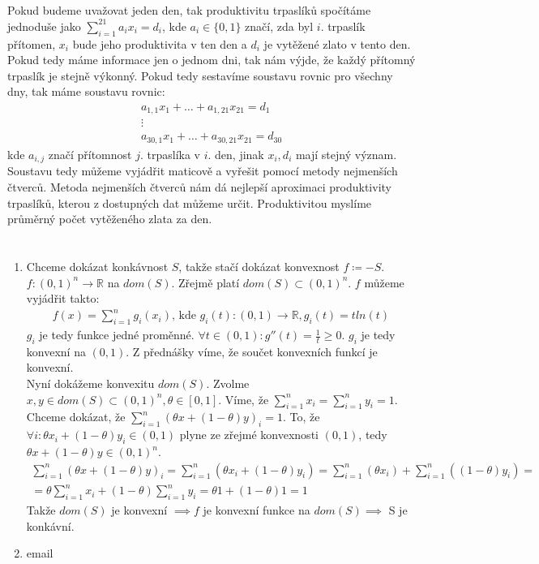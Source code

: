 \documentclass[12pt, a4paper]{article}
\begin{document}
\section{}
Pokud budeme uvažovat jeden den, tak produktivitu trpaslíků spočítáme jednoduše jako $\sum^{21}_{i=1} a_i x_i = d_i$, kde $a_i \in \{0,1\}$ značí, zda byl $i$. trpaslík přítomen, $x_i$ bude jeho produktivita v ten den a $d_i$ je vytěžené zlato v tento den. Pokud tedy máme informace jen o jednom dni, tak nám výjde, že každý přítomný trpaslík je stejně výkonný. Pokud tedy sestavíme soustavu rovnic pro všechny dny, tak máme soustavu rovnic:
\begin{gather*}
a_{1,1}x_1 + \dots + a_{1,21}x_{21} = d_1\\
\vdots\\
a_{30,1}x_1 + \dots + a_{30,21}x_{21} = d_{30}
\end{gather*}
kde $a_{i,j}$ značí přítomnost $j$. trpaslíka v $i$. den, jinak $x_i, d_i$ mají stejný význam. Soustavu tedy můžeme vyjádřit maticově a vyřešit pomocí metody nejmenších čtverců. Metoda nejmenších čtverců nám dá nejlepší aproximaci produktivity trpaslíků, kterou z dostupných dat můžeme určit. Produktivitou myslíme průměrný počet vytěženého zlata za den.

\section{}
\begin{enumerate}[label=\alph*)]
\item Chceme dokázat konkávnost $S$, takže stačí dokázat konvexnost $f \coloneqq -S$. $f: (0,1)^n \rightarrow \mathbb{R}$ na $dom(S)$. Zřejmě platí $dom(S) \subset (0,1)^n$. $f$ můžeme vyjádřit takto:
\begin{gather*}
f(x) = \sum^{n}_{i=1} g_i(x_i) \text{, kde } g_i(t): (0,1) \rightarrow \mathbb{R}, g_i(t) = tln(t)
\end{gather*}
$g_i$ je tedy funkce jedné proměnné. $\forall t \in (0,1): g''(t)=\frac{1}{t} \geq 0$. $g_i$ je tedy konvexní na $(0,1)$. Z přednášky víme, že součet konvexních funkcí je konvexní.\\
Nyní dokážeme konvexitu $dom(S)$. Zvolme $x,y \in dom(S) \subset (0,1)^n, \theta \in [0,1]$. Víme, že $\sum^n_{i=1} x_i = \sum^n_{i=1} y_i = 1$. Chceme dokázat, že $\sum^n_{i=1} (\theta x + (1-\theta)y)_i = 1$. To, že $\forall i: \theta x_i + (1-\theta) y_i \in (0,1)$ plyne ze zřejmé konvexnosti $(0,1)$, tedy $\theta x + (1-\theta)y \in (0,1)^n$. 
\begin{gather*}
\sum^n_{i=1} (\theta x + (1-\theta)y)_i = \sum^n_{i=1}(\theta x_i + (1-\theta)y_i)  = \sum^n_{i=1}(\theta x_i) + \sum^n_{i=1}((1-\theta)y_i) = \\
= \theta \sum^n_{i=1} x_i + (1-\theta)\sum^n_{i=1} y_i = \theta 1 + (1-\theta)1 = 1
\end{gather*}
Takže $dom(S)$ je konvexní $\implies f$ je konvexní funkce na $dom(S) \implies$ S je konkávní.
\item email
\end{enumerate}
\end{document}
